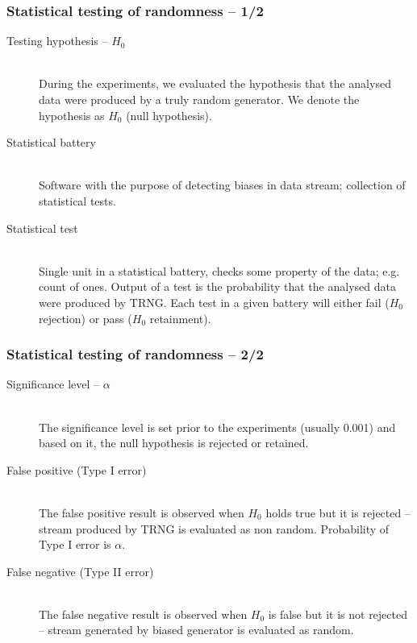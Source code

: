 \documentclass[aspectratio=169]{beamer}
\begin{document}
\begin{frame}
\frametitle{Statistical testing of randomness -- 1/2}

\begin{description}
\item[Testing hypothesis -- $H_0$] \hfill \\
During the experiments, we evaluated the hypothesis that the analysed data were produced by a truly random generator. We denote the hypothesis as $H_0$ (null hypothesis).
\item[Statistical battery] \hfill \\
Software with the purpose of detecting biases in data stream; collection of statistical tests.
\item[Statistical test] \hfill \\
Single unit in a statistical battery, checks some property of the data; e.g. count of ones. Output of a test is the probability that the analysed data were produced by TRNG. Each test in a given battery will either fail ($H_0$ rejection) or pass ($H_0$ retainment).
\end{description}

\end{frame}

\begin{frame}
\frametitle{Statistical testing of randomness -- 2/2}

\begin{description}
\item[Significance level -- $\alpha$] \hfill \\
The significance level is set prior to the experiments (usually 0.001) and based on it, the null hypothesis is rejected or retained.
\item[False positive (Type I error)] \hfill \\
The false positive result is observed when $H_0$ holds true but it is rejected -- stream produced by TRNG is evaluated as non random. Probability of Type I error is $\alpha$.
\item[False negative (Type II error)] \hfill \\
The false negative result is observed when $H_0$ is false but it is not rejected -- stream generated by biased generator is evaluated as random.
\end{description}
\end{frame}
\end{document}
